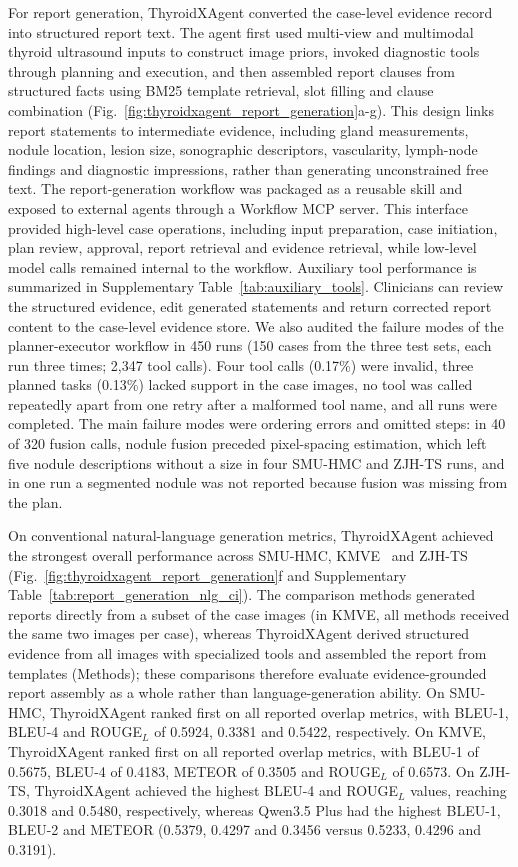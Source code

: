 \documentclass[fleqn,10pt]{wlscirep}
\begin{document}
For report generation, ThyroidXAgent converted the case-level evidence record into structured report text. The agent first used multi-view and multimodal thyroid ultrasound inputs to construct image priors, invoked diagnostic tools through planning and execution, and then assembled report clauses from structured facts using BM25 template retrieval, slot filling and clause combination (Fig.~\ref{fig:thyroidxagent_report_generation}a-g). This design links report statements to intermediate evidence, including gland measurements, nodule location, lesion size, sonographic descriptors, vascularity, lymph-node findings and diagnostic impressions, rather than generating unconstrained free text. The report-generation workflow was packaged as a reusable skill and exposed to external agents through a Workflow MCP server. This interface provided high-level case operations, including input preparation, case initiation, plan review, approval, report retrieval and evidence retrieval, while low-level model calls remained internal to the workflow. Auxiliary tool performance is summarized in Supplementary Table~\ref{tab:auxiliary_tools}. Clinicians can review the structured evidence, edit generated statements and return corrected report content to the case-level evidence store. We also audited the failure modes of the planner-executor workflow in 450 runs (150 cases from the three test sets, each run three times; 2,347 tool calls). Four tool calls (0.17\%) were invalid, three planned tasks (0.13\%) lacked support in the case images, no tool was called repeatedly apart from one retry after a malformed tool name, and all runs were completed. The main failure modes were ordering errors and omitted steps: in 40 of 320 fusion calls, nodule fusion preceded pixel-spacing estimation, which left five nodule descriptions without a size in four SMU-HMC and ZJH-TS runs, and in one run a segmented nodule was not reported because fusion was missing from the plan.

On conventional natural-language generation metrics, ThyroidXAgent achieved the strongest overall performance across SMU-HMC, KMVE~\cite{li_ultrasound_2024} and ZJH-TS (Fig.~\ref{fig:thyroidxagent_report_generation}f and Supplementary Table~\ref{tab:report_generation_nlg_ci}). The comparison methods generated reports directly from a subset of the case images (in KMVE, all methods received the same two images per case), whereas ThyroidXAgent derived structured evidence from all images with specialized tools and assembled the report from templates (Methods); these comparisons therefore evaluate evidence-grounded report assembly as a whole rather than language-generation ability. On SMU-HMC, ThyroidXAgent ranked first on all reported overlap metrics, with BLEU-1, BLEU-4 and ROUGE$_L$ of 0.5924, 0.3381 and 0.5422, respectively. On KMVE, ThyroidXAgent ranked first on all reported overlap metrics, with BLEU-1 of 0.5675, BLEU-4 of 0.4183, METEOR of 0.3505 and ROUGE$_L$ of 0.6573. On ZJH-TS, ThyroidXAgent achieved the highest BLEU-4 and ROUGE$_L$ values, reaching 0.3018 and 0.5480, respectively, whereas Qwen3.5 Plus had the highest BLEU-1, BLEU-2 and METEOR (0.5379, 0.4297 and 0.3456 versus 0.5233, 0.4296 and 0.3191).
\end{document}
